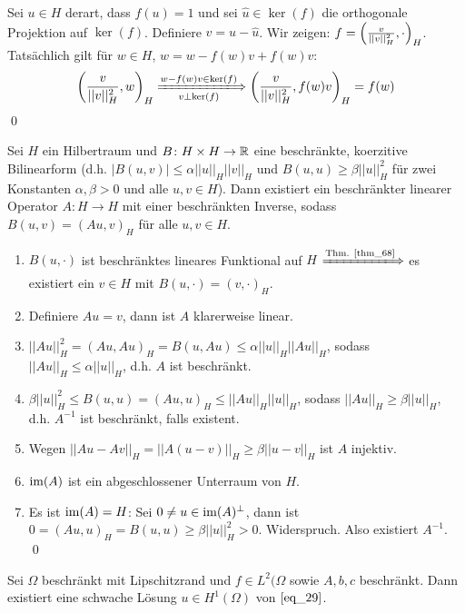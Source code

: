 	Sei $u \in H$ derart, dass $f(u) = 1$ und sei $\hat{u} \in \ker(f)$ die orthogonale Projektion auf $\ker(f)$. Definiere $v = u - \hat{u}$. Wir zeigen: $f = \enbrace*{\frac{v}{||v||^2_H},\cdot}_H$. Tatsächlich gilt für $w \in H$, $w = w-f(w)v + f(w)v$:
	\[ \enbrace*{\frac{v}{||v||_H^2},w}_H \xLongrightarrow[v \perp \ker(f)]{w - f(w)v \in \ker(f)} \enbrace*{\frac{v}{||v||_H^2},f(w)v}_H = f(w) \] \qed
	
\begin{thm} \label{thm_70}
	Sei $H$ ein Hilbertraum und $B\colon H \times H \rightarrow \RR$ \marginnote{[70]} eine beschränkte, koerzitive Bilinearform (d.h. $|B(u,v)| \leq \alpha ||u||_H ||v||_H$ und $B(u,u) \geq \beta ||u||^2_H$ für zwei Konstanten $\alpha,\beta > 0$ und alle $u,v \in H$). Dann existiert ein beschränkter linearer Operator $A \colon H \rightarrow H$ mit einer beschränkten Inverse, sodass $B(u,v) = (Au,v)_H$ für alle $u,v \in H$.
\end{thm}
	
	\begin{enumerate}[1.]
		\item $B(u,\cdot)$ ist beschränktes lineares Funktional auf $H$ $\xLongrightarrow{\text{Thm. \ref{thm_68}}}$ es existiert ein $v \in H$ mit $B(u,\cdot) = (v,\cdot)_H$.
		\item Definiere $Au = v$, dann ist $A$ klarerweise linear.
		\item $||Au||_H^2 = (Au,Au)_H = B(u,Au) \leq \alpha ||u||_H ||Au||_H$, sodass $||Au||_H \leq \alpha ||u||_H$, d.h. $A$ ist beschränkt.
		\item $\beta ||u||_H^2 \leq B(u,u) = (Au,u)_H \leq ||Au||_H ||u||_H$, sodass $||Au||_H \geq \beta ||u||_H$, d.h. $A^{-1}$ ist beschränkt, falls existent.
		\item Wegen $||Au-Av||_H = ||A(u-v)||_H \geq \beta ||u-v||_H$ ist $A$ injektiv.
		\item $\im(A)$ ist ein abgeschlossener Unterraum von $H$.
		\item Es ist $\im(A) = H$: Sei $0 \neq u \in \im(A)^\perp$, dann ist $0 = (Au,u)_H = B(u,u) \geq \beta ||u||_H^2 > 0$. Widerspruch. Also existiert $A^{-1}$. \qed
	\end{enumerate}
	
\begin{thm} \label{thm_71}
	Sei $\Omega$ beschränkt mit Lipschitzrand und $f \in L^2(\Omega$ sowie $A,b,c$ beschränkt. \marginnote{[71]} Dann existiert eine schwache Lösung $u \in H^1(\Omega)$ von $\eqref{eq_29}$.
\end{thm}

